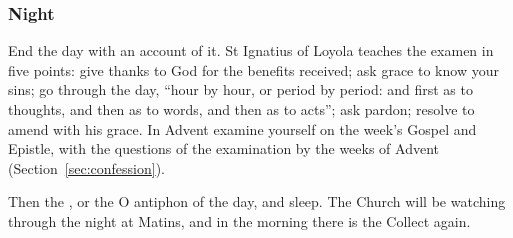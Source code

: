 \subsubsection*{Night}

End the day with an account of it. St Ignatius of Loyola teaches the examen in
five points: give thanks to God for the benefits received; ask grace to know
your sins; go through the day, ``hour by hour, or period by period: and first as
to thoughts, and then as to words, and then as to acts''; ask pardon; resolve
to amend with his grace. In Advent examine yourself on the week's Gospel and
Epistle, with the questions of the examination by the weeks of Advent
(Section~\ref{sec:confession}).

Then the , or the O antiphon of the day, and sleep. The Church will
be watching through the night at Matins, and in the morning there is the
Collect again.
